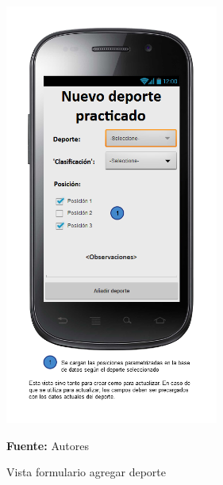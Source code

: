 \begin{figure}[!htb]
  \begin{center}
\includegraphics[width=7cm]{./imagenes/UI/Usuarios/formulario_agregar_deporte.png}
    \caption{Vista formulario agregar deporte}
    \label{fig:Vista_formulario_agregar_deporte}
    \textbf{Fuente:}  Autores
  \end{center}
\end{figure}
